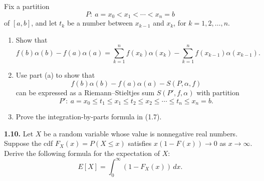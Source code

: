 Fix a partition
\[
P:\ a=x_0<x_1<\cdots <x_n=b
\]
of $[a,b]$, and let $t_k$ be a number between $x_{k-1}$ and $x_k$, for $k=1,2,\dots,n$.
\begin{enumerate}[label=(\alph*)]
    \item Show that
    \[
    f(b)\alpha(b)-f(a)\alpha(a)
    =
    \sum_{k=1}^{n} f(x_k)\alpha(x_k)
    -
    \sum_{k=1}^{n} f(x_{k-1})\alpha(x_{k-1}).
    \]
    \item Use part (a) to show that
    \[
    f(b)\alpha(b)-f(a)\alpha(a)-S(P,\alpha,f)
    \]
    can be expressed as a Riemann--Stieltjes sum $S(P',f,\alpha)$ with partition
    \[
    P':\ a=x_0\le t_1\le x_1\le t_2\le x_2\le \cdots \le t_n\le x_n=b.
    \]
    \item Prove the integration-by-parts formula in (1.7).
\end{enumerate}

\textbf{1.10.} Let $X$ be a random variable whose value is nonnegative real numbers. Suppose the cdf $F_X(x)=P(X\le x)$ satisfies $x(1-F(x))\to 0$ as $x\to \infty$. Derive the following formula for the expectation of $X$:
\[
E[X]=\int_0^{\infty} (1-F_X(x))\, dx.
\]
